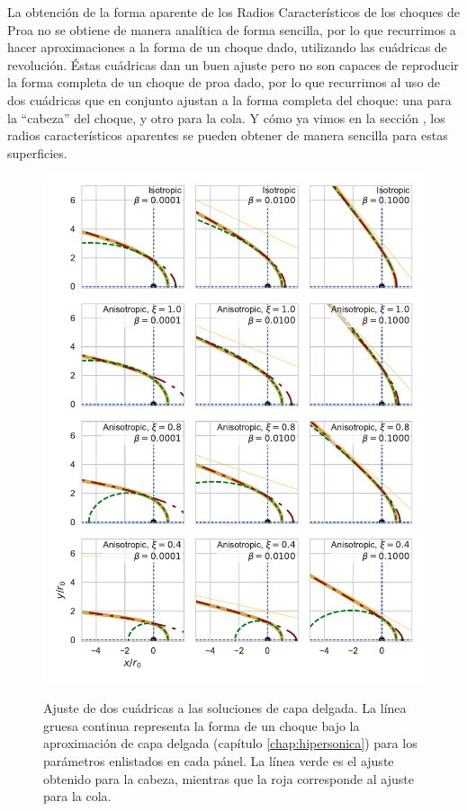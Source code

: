 La obtención de la forma aparente de los Radios Característicos de los choques de Proa
no se obtiene de manera analítica de forma sencilla, por lo que recurrimos a hacer
aproximaciones a la forma de un choque dado, utilizando las cuádricas de revolución.
Éstas cuádricas dan un buen ajuste pero no son capaces de reproducir la forma completa
de un choque de proa dado, por lo que recurrimos al uso de dos cuádricas que en conjunto
ajustan a la forma completa del choque: una para la ``cabeza'' del choque, y otro para la cola.
Y cómo ya vimos en la sección , los radios característicos aparentes se pueden obtener de
manera sencilla para estas superficies.

\begin{figure}
  \includegraphics[width = 0.8\linewidth]{./Figures/conic-head-tail-analytic}
  \label{fig:conic-head-tail-fit}
  \caption{Ajuste de dos cuádricas a las soluciones de capa delgada. La línea gruesa continua
    representa la forma de un choque bajo la aproximación de capa delgada (capítulo
    \ref{chap:hipersonica}) para los parámetros enlistados en cada pánel. La línea verde es el
    ajuste obtenido para la cabeza, mientras que la roja corresponde al ajuste para la cola.}
\end{figure}


